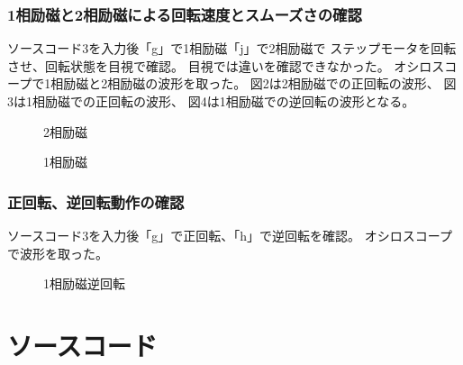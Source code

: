 \documentclass[10pt,a4paper]{jarticle}
\begin{document}
\subsubsection{1相励磁と2相励磁による回転速度とスムーズさの確認}
ソースコード3を入力後「g」で1相励磁「j」で2相励磁で
ステップモータを回転させ、回転状態を目視で確認。
目視では違いを確認できなかった。
オシロスコープで1相励磁と2相励磁の波形を取った。
図2は2相励磁での正回転の波形、
図3は1相励磁での正回転の波形、
図4は1相励磁での逆回転の波形となる。
\begin{figure}[hbtp]
 \begin{minipage}{0.5\hsize}
 \begin{center}
 \caption{2相励磁}
 \label{fig:2rei}
 \end{center}
 \end{minipage}
 \begin{minipage}{0.5\hsize}
 \begin{center}
 \caption{1相励磁}
 \label{fig:1rei}
 \end{center}
 \end{minipage}
\end{figure}
\subsubsection{正回転、逆回転動作の確認}
ソースコード3を入力後「g」で正回転、「h」で逆回転を確認。
オシロスコープで波形を取った。
\begin{figure}[hbtp]
 \begin{center}
 \caption{1相励磁逆回転}
 \label{fig:gyaku}
 \end{center}
\end{figure}
\section{ソースコード}

\par\par

\par\par

\par\par
\end{document}
